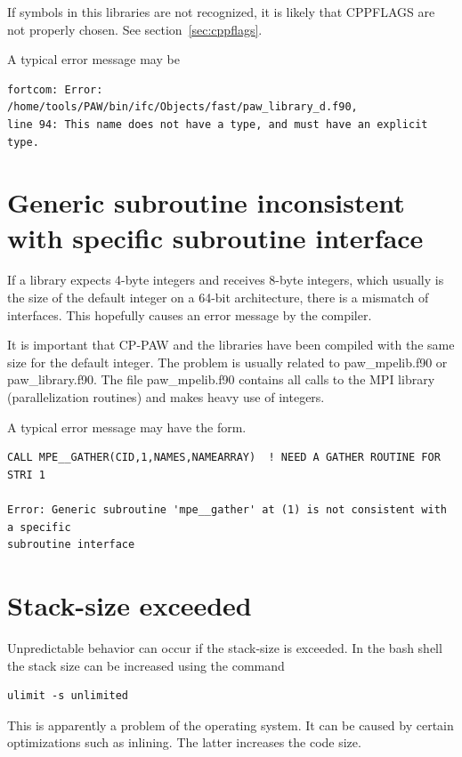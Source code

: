 \documentclass[a4paper,10pt]{report}
\begin{document}
If symbols in this libraries are not recognized, it is likely that
CPPFLAGS are not properly chosen. See section~\ref{sec:cppflags}.

A typical error message may be
\begin{verbatim}
fortcom: Error: /home/tools/PAW/bin/ifc/Objects/fast/paw_library_d.f90, 
line 94: This name does not have a type, and must have an explicit type.
\end{verbatim}

\section{Generic subroutine inconsistent with specific subroutine interface}

If a library expects 4-byte integers and receives 8-byte integers,
which usually is the size of the default integer on a 64-bit
architecture, there is a mismatch of interfaces. This hopefully causes
an error message by the compiler.

It is important that CP-PAW and the libraries have been compiled with
the same size for the default integer. The problem is usually related
to paw\_mpelib.f90 or paw\_library.f90. The file paw\_mpelib.f90
contains all calls to the MPI library (parallelization routines) and
makes heavy use of integers.

A typical error message may have the form.
\begin{verbatim}
CALL MPE__GATHER(CID,1,NAMES,NAMEARRAY)  ! NEED A GATHER ROUTINE FOR STRI 1

Error: Generic subroutine 'mpe__gather' at (1) is not consistent with a specific 
subroutine interface
\end{verbatim}

\section{Stack-size exceeded}
Unpredictable behavior can occur if the stack-size is exceeded. In the
bash shell the stack size can be increased using the command
\begin{verbatim}
ulimit -s unlimited
\end{verbatim}
 This is apparently a problem of the operating system. It can be
caused by certain optimizations such as inlining. The latter increases
the code size.
\end{document}
